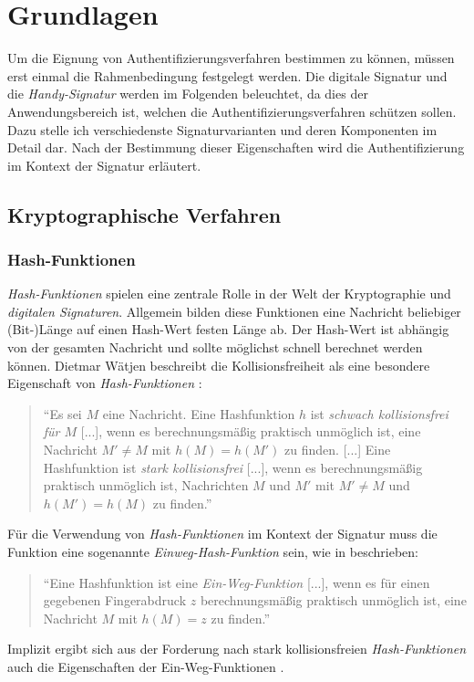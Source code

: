 \documentclass[11pt,a4paper,ngerman]{scrreprt}
\begin{document}
\chapter{Grundlagen}
Um die Eignung von Authentifizierungsverfahren bestimmen zu können, müssen erst einmal die Rahmenbedingung festgelegt werden. Die digitale Signatur und die \textit{Handy-Signatur} werden im Folgenden beleuchtet, da dies der Anwendungsbereich ist, welchen die Authentifizierungsverfahren schützen sollen. Dazu stelle ich verschiedenste Signaturvarianten und deren Komponenten im Detail dar. Nach der Bestimmung dieser Eigenschaften wird die Authentifizierung im Kontext der Signatur erläutert.

\section{Kryptographische Verfahren}
\subsection{Hash-Funktionen}\label{sec:Hash-Funktionen}
\textit{Hash-Funktionen} spielen eine zentrale Rolle in der Welt der Kryptographie und \textit{digitalen Signaturen}. Allgemein bilden diese Funktionen eine Nachricht beliebiger (Bit-)Länge auf einen Hash-Wert festen Länge ab. Der Hash-Wert ist abhängig von der gesamten Nachricht und sollte möglichst schnell berechnet werden können. Dietmar Wätjen beschreibt die Kollisionsfreiheit als eine besondere Eigenschaft von \textit{Hash-Funktionen} \cite[S. 89]{krypt08}: 
\begin{quote}
    ``Es sei $M$ eine Nachricht. Eine Hashfunktion $h$ ist \emph{schwach kollisionsfrei für $M$} [...], wenn es berechnungsmäßig praktisch unmöglich ist, eine Nachricht $M' \neq M$ mit $h(M) = h(M')$ zu finden. [...]
    Eine Hashfunktion ist \emph{stark kollisionsfrei} [...], wenn es berechnungsmäßig praktisch unmöglich ist, Nachrichten $M$ und $M'$ mit $M' \neq M$ und $h(M') = h(M)$ zu finden.''
\end{quote}
Für die Verwendung von \emph{Hash-Funktionen} im Kontext der Signatur muss die Funktion eine sogenannte \emph{Einweg-Hash-Funktion} sein, wie in \cite[S. 99]{krypt08} beschrieben:
\begin{quote}
    ``Eine Hashfunktion ist eine \emph{Ein-Weg-Funktion} [...], wenn es für einen gegebenen Fingerabdruck $z$ berechnungsmäßig praktisch unmöglich ist, eine Nachricht $M$ mit $h(M)=z$ zu finden.''
\end{quote}
Implizit ergibt sich aus der Forderung nach stark kollisionsfreien \textit{Hash-Funktionen} auch die Eigenschaften der Ein-Weg-Funktionen \cite[S. 99]{krypt08}.
\end{document}
